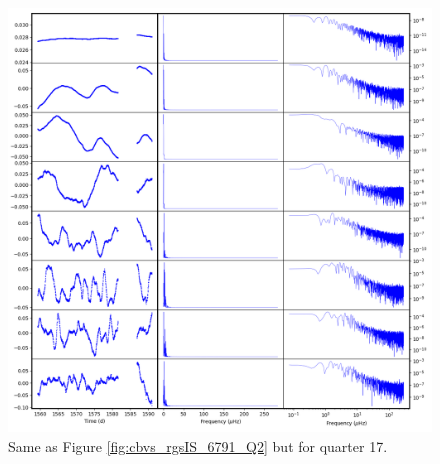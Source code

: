 \begin{figure}
    \centering
    \includegraphics[width=\linewidth]{Chapter_Appended/AppB/cbv_6791_rgs_q17.png}
    \caption{Same as Figure \ref{fig:cbvs_rgsIS_6791_Q2} but for quarter 17.}
    \label{fig:cbvs_rgsIS_6791_Q17}
\end{figure}

\clearpage

